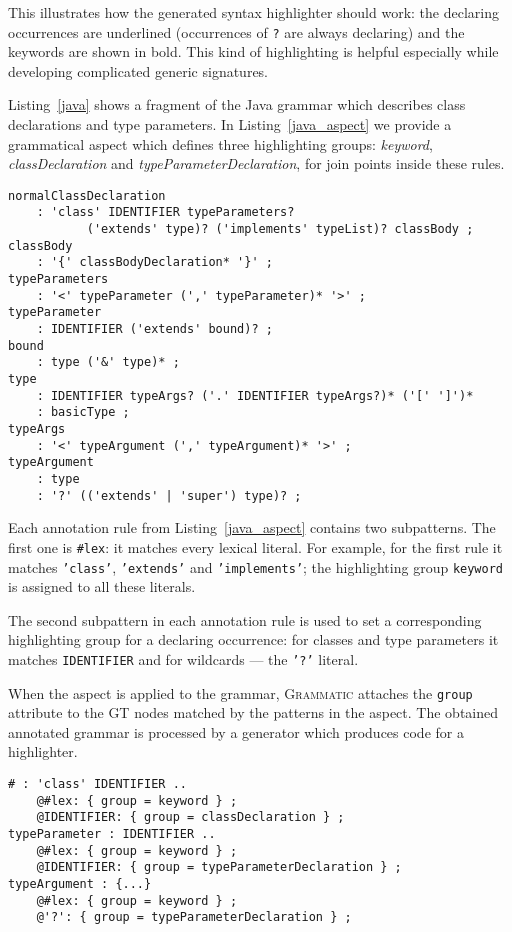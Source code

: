 \documentclass[10pt]{llncs}
\newcommand{\lstref}[1]{Listing~\ref{#1}}
\newcommand{\tool}[1]{\textsc{#1}}
\newcommand{\Grammatic}[0]{\tool{Grammatic}}
\begin{document}
This illustrates how the generated syntax highlighter should work: the declaring occurrences are underlined (occurrences of \texttt{?} are always declaring) and the keywords are shown in bold. This kind of highlighting is helpful especially while developing complicated generic signatures.

\lstref{java} shows a fragment of the Java grammar \cite{JLS} which describes class declarations and type parameters. In \lstref{java_aspect} we provide a grammatical aspect which defines three highlighting groups: \emph{keyword}, \emph{classDeclaration} and \emph{typeParameterDeclaration}, for join points inside these rules.

\begin{lstlisting}[language=Grammatic,caption=Class declaration syntax in Java 5,label=java,float]
normalClassDeclaration
	: 'class' IDENTIFIER typeParameters? 
           ('extends' type)? ('implements' typeList)? classBody ;
classBody
	: '{' classBodyDeclaration* '}' ;
typeParameters
	: '<' typeParameter (',' typeParameter)* '>' ;
typeParameter
	: IDENTIFIER ('extends' bound)? ;
bound
	: type ('&' type)* ;
type
	: IDENTIFIER typeArgs? ('.' IDENTIFIER typeArgs?)* ('[' ']')*
	: basicType ;
typeArgs
	: '<' typeArgument (',' typeArgument)* '>' ;
typeArgument
	: type
	: '?' (('extends' | 'super') type)? ;
\end{lstlisting}

\lstset{language=Grammatic}
Each annotation rule from \lstref{java_aspect} contains two subpatterns. The first one is \texttt{\#lex}: it matches every lexical literal. For example, for the first rule it matches \texttt{'class'}, \texttt{'extends'} and \texttt{'implements'}; the highlighting group \texttt{keyword} is assigned to all these literals.

The second subpattern in each annotation rule is used to set a corresponding highlighting group for a declaring occurrence: for classes and type parameters it matches \texttt{IDENTIFIER} and for wildcards --- the \texttt{'?'} literal.

When the aspect is applied to the grammar, \Grammatic{} attaches the \texttt{group} attribute to the GT nodes matched by the patterns in the aspect. The obtained annotated grammar is processed by a generator which produces code for a highlighter.

\begin{lstlisting}[language=Grammatic,caption=Highlighting aspect for class declarations in Java,float,label=java_aspect]
# : 'class' IDENTIFIER ..
	@#lex: { group = keyword } ;
	@IDENTIFIER: { group = classDeclaration } ;
typeParameter : IDENTIFIER ..
	@#lex: { group = keyword } ;
	@IDENTIFIER: { group = typeParameterDeclaration } ;
typeArgument : {...}
	@#lex: { group = keyword } ;
	@'?': { group = typeParameterDeclaration } ;
\end{lstlisting}
\end{document}
